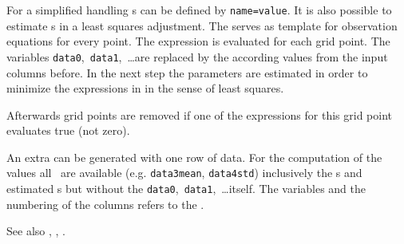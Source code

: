 For a simplified handling s can be defined by \verb|name=value|.
It is also possible to estimate s in a least squares adjustment.
The  serves as template for observation equations for every point.
The expression  is evaluated for each grid point.
The variables \verb|data0|,~\verb|data1|,~\ldots are replaced by the according values from the input columns before.
In the next step the parameters are estimated in order to minimize the expressions in 
in the sense of least squares.

Afterwards grid points are removed if one of the  expressions
for this grid point evaluates true (not zero).

An extra  can be generated with one row of data.
For the computation of the  values
all~ are available
(e.g. \verb|data3mean|, \verb|data4std|) inclusively the s and
estimated s but without the \verb|data0|,~\verb|data1|,~\ldots itself.
The variables and the numbering of the columns refers to the .

See also , , .


